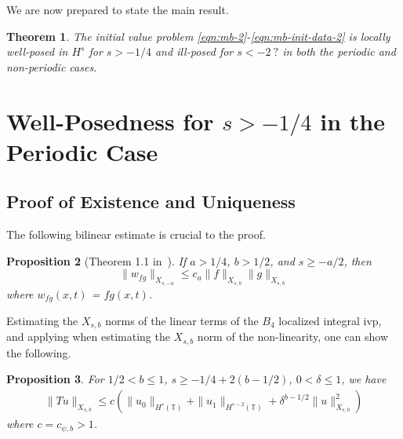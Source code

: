 \documentclass[12pt,reqno]{amsart}
\numberwithin{equation}{section}  %
\renewcommand{\cref}{\Cref}
\newcommand{\ci}{\mathbb{T}}
\newtheorem{theorem}{Theorem}[section]
\newtheorem{proposition}[theorem]{Proposition}
\begin{document}
%
We are now prepared to state the main result.
%
%
%
%
%
%
%
%
%
%
\begin{theorem}
\label{thm:main}
The initial value problem 
\eqref{eqn:mb-2}-\eqref{eqn:mb-init-data-2} is locally well-posed in $H^s$ for
$s >
-1/4$ and ill-posed for $s < -2 \ ?$ in both the periodic and non-periodic cases.
%
%
\end{theorem} 
%
%
%
%
%
%
%
%
%
%
%
%
%
%
\section{Well-Posedness for $s > -1/4$ in the Periodic Case}
%
%
%
%
\subsection{Proof of Existence and Uniqueness}
\label{sec:proof-b4-per-case}
%
%
%
%				 
%
The following bilinear
estimate is crucial to the proof.
%
%
%
%
%
%
%
%
\begin{proposition}[Theorem 1.1 in~\cite{Farah:2009uq}]
\label{prop:bilinear-est}
	If $a > 1/4$, $b > 1/2$, and $s \ge -a/2$, 
  then 
	\begin{equation}
    \| w_{fg} \|_{X_{s,-a}}
		    \le c_{a} \|f\|_{X_{s,b}} \|g\|_{X_{s,b}}
	\end{equation}
  where $w_{fg}(x,t)$ = $fg (x,t)$.
%
%
%
%
\end{proposition}
%
Estimating the $X_{s,b}$ norms of the linear terms of the $B_{4}$ localized
integral ivp, and applying \cref{prop:bilinear-est} when estimating the
$X_{s,b}$ norm of the non-linearity,
one can show the following.
%
\begin{proposition}
\label{prop:contraction}
%
For $1/2 < b \le 1$, $s \ge -1/4 + 2(b -1/2)$, $0 < \delta \le 1$, we have
%
\begin{equation*}
	\begin{split}
    \|Tu\|_{X_{s,b}} \le c \left( \|u_0 \|_{H^s(\ci)} + \|u_1 \|_{H^{s-2}(\ci)}
    + \delta^{b-1/2} \|u\|_{X_{s,b}}^2 
		\right)
	\end{split}
\end{equation*}
%
where $c = c_{\psi, b} > 1$.  
\end{proposition}
\end{document}

